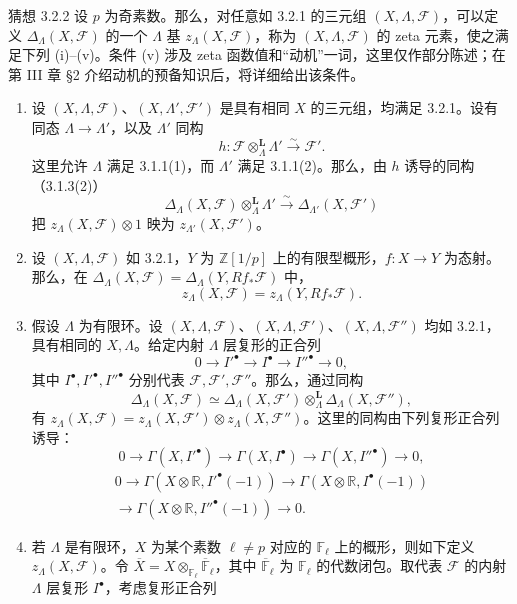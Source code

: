 \begin{statement}{猜想 3.2.2}
设 $p$ 为奇素数。那么，对任意如 3.2.1 的三元组 $(X,\Lambda,\mathcal F)$，可以定义 $\Delta_\Lambda(X,\mathcal F)$ 的一个 $\Lambda$ 基 $z_\Lambda(X,\mathcal F)$，称为 $(X,\Lambda,\mathcal F)$ 的 zeta 元素，使之满足下列 (i)--(v)。条件 (v) 涉及 zeta 函数值和“动机”一词，这里仅作部分陈述；在第 III 章 §2 介绍动机的预备知识后，将详细给出该条件。
\begin{enumerate}[label=(\roman*)]
\item 设 $(X,\Lambda,\mathcal F)$、$(X,\Lambda',\mathcal F')$ 是具有相同 $X$ 的三元组，均满足 3.2.1。设有同态 $\Lambda\to\Lambda'$，以及 $\Lambda'$ 同构
\[
 h:\mathcal F\otimes^{\mathbf L}_\Lambda\Lambda'\xrightarrow{\sim}\mathcal F'.
\]
这里允许 $\Lambda$ 满足 3.1.1(1)，而 $\Lambda'$ 满足 3.1.1(2)。那么，由 $h$ 诱导的同构（3.1.3(2)）
\[
 \Delta_\Lambda(X,\mathcal F)\otimes^{\mathbf L}_\Lambda\Lambda'
 \xrightarrow{\sim}\Delta_{\Lambda'}(X,\mathcal F')
\]
把 $z_\Lambda(X,\mathcal F)\otimes1$ 映为 $z_{\Lambda'}(X,\mathcal F')$。
\item 设 $(X,\Lambda,\mathcal F)$ 如 3.2.1，$Y$ 为 $\mathbb Z[1/p]$ 上的有限型概形，$f:X\to Y$ 为态射。那么，在 $\Delta_\Lambda(X,\mathcal F)=\Delta_\Lambda(Y,Rf_*\mathcal F)$ 中，
\[
 z_\Lambda(X,\mathcal F)=z_\Lambda(Y,Rf_*\mathcal F).
\]
\item 假设 $\Lambda$ 为有限环。设 $(X,\Lambda,\mathcal F)$、$(X,\Lambda,\mathcal F')$、$(X,\Lambda,\mathcal F'')$ 均如 3.2.1，具有相同的 $X,\Lambda$。给定内射 $\Lambda$ 层复形的正合列
\begin{equation*}\tag{*}
 0\longrightarrow I'^\bullet\longrightarrow I^\bullet\longrightarrow I''^\bullet\longrightarrow0,
\end{equation*}
其中 $I^\bullet,I'^\bullet,I''^\bullet$ 分别代表 $\mathcal F,\mathcal F',\mathcal F''$。那么，通过同构
\[
 \Delta_\Lambda(X,\mathcal F)\simeq
 \Delta_\Lambda(X,\mathcal F')\otimes^{\mathbf L}_\Lambda\Delta_\Lambda(X,\mathcal F''),
\]
有 $z_\Lambda(X,\mathcal F)=z_\Lambda(X,\mathcal F')\otimes z_\Lambda(X,\mathcal F'')$。这里的同构由下列复形正合列诱导：
\[
 0\to\Gamma(X,I'^\bullet)\to\Gamma(X,I^\bullet)\to\Gamma(X,I''^\bullet)\to0,
\]
\[
 \begin{gathered}
 0\to\Gamma(X\otimes\mathbb R,I'^\bullet(-1))
 \to\Gamma(X\otimes\mathbb R,I^\bullet(-1))\\
 \to\Gamma(X\otimes\mathbb R,I''^\bullet(-1))\to0.
 \end{gathered}
\]
\item 若 $\Lambda$ 是有限环，$X$ 为某个素数 $\ell\ne p$ 对应的 $\mathbb F_\ell$ 上的概形，则如下定义 $z_\Lambda(X,\mathcal F)$。令 $\overline X=X\otimes_{\mathbb F_\ell}\overline{\mathbb F}_\ell$，其中 $\overline{\mathbb F}_\ell$ 为 $\mathbb F_\ell$ 的代数闭包。取代表 $\mathcal F$ 的内射 $\Lambda$ 层复形 $I^\bullet$，考虑复形正合列

\end{enumerate}
\end{statement}
